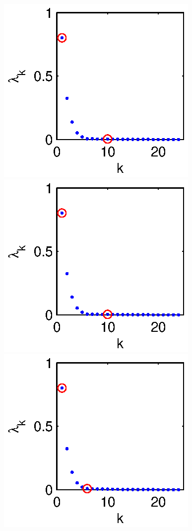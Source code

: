 \begin{figure}[!t]
\includegraphics[width=\figwidth]{data_linear_evals1}
\includegraphics[width=\figwidth]{data_linear_evals2}
\includegraphics[width=\figwidth]{data_linear_evals3}


\end{figure}
